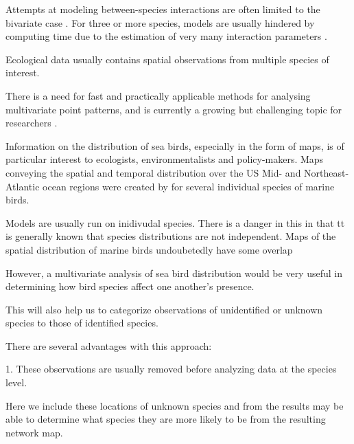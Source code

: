 \documentclass{statsoc}
\begin{document}
Attempts at modeling between-species interactions are often limited to the bivariate case \citep{Andersen1992, Nightingale2015}. For three or more species, models are usually hindered by computing time due to the estimation of very many interaction parameters \citep{Jalilian2015}. 

Ecological data usually contains spatial observations from multiple species of interest. 

There is a need for fast and practically applicable methods for analysing multivariate point patterns, and is currently a growing but challenging topic for researchers \citep{Moller2016}.





Information on the distribution of sea birds, especially in the form of maps, is of particular interest to ecologists, environmentalists and policy-makers. Maps conveying the spatial and temporal distribution over the US Mid- and Northeast-Atlantic ocean regions were created by \cite{Balderama2016} for several individual species of marine birds. 

Models are usually run on inidivudal species. 
There is a danger in this in that tt is generally known that species distributions are not independent.
Maps of the spatial distribution of marine birds undoubetedly have some overlap


However, a multivariate analysis of sea bird distribution would be very useful in determining how bird species affect one another's presence. 

This will also help us to categorize observations of unidentified or unknown species to those of identified species.





There are several advantages with this approach:

1. These observations are usually removed before analyzing data at the species level. 

Here we include these locations of unknown species and from the results may be able to determine what species they are more likely to be from the resulting network map. 
\end{document}
